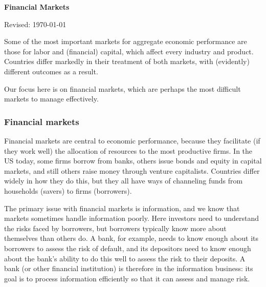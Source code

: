 \documentclass[letterpaper,12pt]{article}
\def\HeadName{Financial Markets}
\begin{document}
\thispagestyle{empty}%
\Head

\centerline{\large \bf \HeadName}%
\centerline{Revised: \today}

\bigskip
Some of the most important markets for aggregate economic performance
are those for labor and (financial) capital,
which affect every industry and product.
Countries differ markedly in their treatment of both markets,
with (evidently) different outcomes as a result.

Our focus here is on financial markets,
which are perhaps the most difficult markets to manage effectively.


\subsubsection*{Financial markets}

Financial markets are central to economic performance,
because they facilitate (if they work well)
the allocation of resources to the most productive firms.
In the US today,
some firms borrow from banks,
others issue bonds and equity in capital markets,
and still others raise money through venture capitalists.
Countries differ widely in how they do this,
but they all have ways of channeling funds from
households (savers) to firms (borrowers).


The primary issue with financial markets is information,
and we know that markets sometimes handle information poorly.  
Here investors need to understand the risks faced by borrowers, 
but borrowers typically know more about themselves than others do.  
A bank, for example, needs to know enough about its borrowers to 
assess the risk of default, 
and its depositors need to know enough about the bank's ability to 
do this well to assess the risk to their deposits.  
A bank (or other financial institution) is therefore in the information business:
its goal is to process information efficiently so that it 
can assess and manage risk.  
\end{document}
